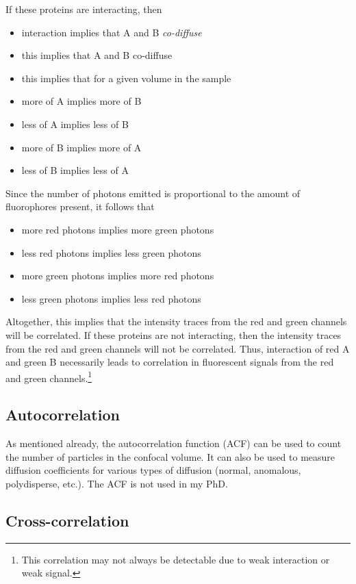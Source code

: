\documentclass[12pt,]{book}
\providecommand{\tightlist}{%
  \setlength{\itemsep}{0pt}\setlength{\parskip}{0pt}}
\let\rmarkdownfootnote\footnote%
\def\footnote{\protect\rmarkdownfootnote}
\theoremstyle{definition}
\theoremstyle{definition}
\theoremstyle{definition}
\theoremstyle{remark}
\begin{document}
If these proteins are interacting, then

\begin{itemize}
\tightlist
\item
  interaction implies that A and B \emph{co-diffuse}
\item
  this implies that A and B co-diffuse
\item
  this implies that for a given volume in the sample
\item
  more of A implies more of B
\item
  less of A implies less of B
\item
  more of B implies more of A
\item
  less of B implies less of A
\end{itemize}

Since the number of photons emitted is proportional to the amount of
fluorophores present, it follows that

\begin{itemize}
\tightlist
\item
  more red photons implies more green photons
\item
  less red photons implies less green photons
\item
  more green photons implies more red photons
\item
  less green photons implies less red photons
\end{itemize}

Altogether, this implies that the intensity traces from the red and
green channels will be correlated. If these proteins are not
interacting, then the intensity traces from the red and green channels
will not be correlated. Thus, interaction of red A and green B
necessarily leads to correlation in fluorescent signals from the red and
green channels.\footnote{This correlation may not always be detectable
  due to weak interaction or weak signal.}

\subsection{Autocorrelation}\label{autocorrelation}

As mentioned already, the autocorrelation function (ACF) can be used to
count the number of particles in the confocal volume. It can also be
used to measure diffusion coefficients for various types of diffusion
(normal, anomalous, polydisperse, etc.). The ACF is not used in my PhD.

\subsection{Cross-correlation}\label{cross-correlation}
\end{document}

